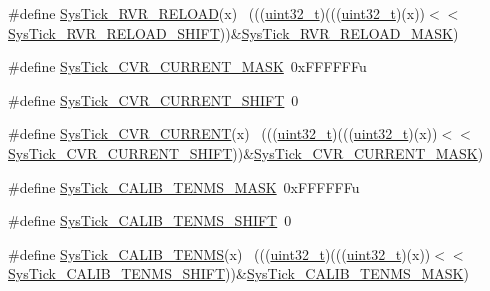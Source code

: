 \begin{DoxyCompactItemize}
\item 
\#define \hyperlink{group___sys_tick___register___masks_gabe33788bbfefe67549f0da8cabbc2495}{Sys\+Tick\+\_\+\+R\+V\+R\+\_\+\+R\+E\+L\+O\+AD}(x)                                    ~(((\hyperlink{_p_e___types_8h_a33594304e786b158f3fb30289278f5af}{uint32\+\_\+t})(((\hyperlink{_p_e___types_8h_a33594304e786b158f3fb30289278f5af}{uint32\+\_\+t})(x))$<$$<$\hyperlink{group___sys_tick___register___masks_gaada5987ab8604965af6e1437c97ee963}{Sys\+Tick\+\_\+\+R\+V\+R\+\_\+\+R\+E\+L\+O\+A\+D\+\_\+\+S\+H\+I\+FT}))\&\hyperlink{group___sys_tick___register___masks_gaec96452b3f6bd6a6ca6496cbbad9a9aa}{Sys\+Tick\+\_\+\+R\+V\+R\+\_\+\+R\+E\+L\+O\+A\+D\+\_\+\+M\+A\+SK})
\item 
\#define \hyperlink{group___sys_tick___register___masks_ga24c6d345c97c669b426339ffda71aa8b}{Sys\+Tick\+\_\+\+C\+V\+R\+\_\+\+C\+U\+R\+R\+E\+N\+T\+\_\+\+M\+A\+SK}~0x\+F\+F\+F\+F\+F\+Fu
\item 
\#define \hyperlink{group___sys_tick___register___masks_ga1e9eb575c58a4638dabd21775fa22c19}{Sys\+Tick\+\_\+\+C\+V\+R\+\_\+\+C\+U\+R\+R\+E\+N\+T\+\_\+\+S\+H\+I\+FT}~0
\item 
\#define \hyperlink{group___sys_tick___register___masks_ga97b2a7bb2c882eb623545fdad8b93316}{Sys\+Tick\+\_\+\+C\+V\+R\+\_\+\+C\+U\+R\+R\+E\+NT}(x)                                  ~(((\hyperlink{_p_e___types_8h_a33594304e786b158f3fb30289278f5af}{uint32\+\_\+t})(((\hyperlink{_p_e___types_8h_a33594304e786b158f3fb30289278f5af}{uint32\+\_\+t})(x))$<$$<$\hyperlink{group___sys_tick___register___masks_ga1e9eb575c58a4638dabd21775fa22c19}{Sys\+Tick\+\_\+\+C\+V\+R\+\_\+\+C\+U\+R\+R\+E\+N\+T\+\_\+\+S\+H\+I\+FT}))\&\hyperlink{group___sys_tick___register___masks_ga24c6d345c97c669b426339ffda71aa8b}{Sys\+Tick\+\_\+\+C\+V\+R\+\_\+\+C\+U\+R\+R\+E\+N\+T\+\_\+\+M\+A\+SK})
\item 
\#define \hyperlink{group___sys_tick___register___masks_gac7496217678b52cce71dd785ed2b779b}{Sys\+Tick\+\_\+\+C\+A\+L\+I\+B\+\_\+\+T\+E\+N\+M\+S\+\_\+\+M\+A\+SK}~0x\+F\+F\+F\+F\+F\+Fu
\item 
\#define \hyperlink{group___sys_tick___register___masks_gad2786b21e30185770874c88e29f22047}{Sys\+Tick\+\_\+\+C\+A\+L\+I\+B\+\_\+\+T\+E\+N\+M\+S\+\_\+\+S\+H\+I\+FT}~0
\item 
\#define \hyperlink{group___sys_tick___register___masks_ga67fd5343d7d5e3040a03a9d2a0cb4f33}{Sys\+Tick\+\_\+\+C\+A\+L\+I\+B\+\_\+\+T\+E\+N\+MS}(x)                                  ~(((\hyperlink{_p_e___types_8h_a33594304e786b158f3fb30289278f5af}{uint32\+\_\+t})(((\hyperlink{_p_e___types_8h_a33594304e786b158f3fb30289278f5af}{uint32\+\_\+t})(x))$<$$<$\hyperlink{group___sys_tick___register___masks_gad2786b21e30185770874c88e29f22047}{Sys\+Tick\+\_\+\+C\+A\+L\+I\+B\+\_\+\+T\+E\+N\+M\+S\+\_\+\+S\+H\+I\+FT}))\&\hyperlink{group___sys_tick___register___masks_gac7496217678b52cce71dd785ed2b779b}{Sys\+Tick\+\_\+\+C\+A\+L\+I\+B\+\_\+\+T\+E\+N\+M\+S\+\_\+\+M\+A\+SK})
$$
\end{DoxyCompactItemize}
